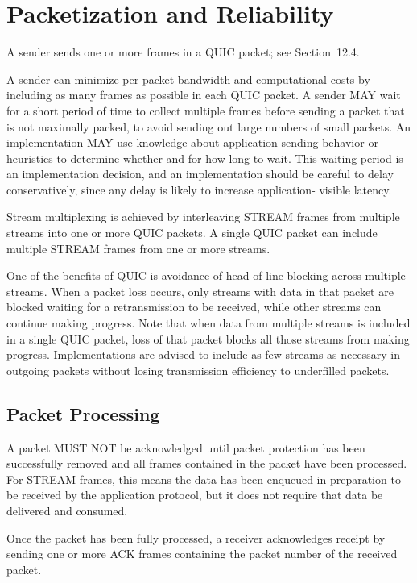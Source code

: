 \documentclass{article}
\begin{document}
\section{Packetization and Reliability}

A sender sends one or more frames in a QUIC packet; see Section~12.4.

A sender can minimize per-packet bandwidth and computational costs by including as many frames as possible in each QUIC packet.  A sender MAY wait for a short period of time to collect multiple frames before sending a packet that is not maximally packed, to avoid sending out large numbers of small packets.  An implementation MAY use knowledge about application sending behavior or heuristics to determine whether and for how long to wait.  This waiting period is an implementation decision, and an implementation should be careful to delay conservatively, since any delay is likely to increase application- visible latency.

Stream multiplexing is achieved by interleaving STREAM frames from multiple streams into one or more QUIC packets.  A single QUIC packet can include multiple STREAM frames from one or more streams.

One of the benefits of QUIC is avoidance of head-of-line blocking across multiple streams.  When a packet loss occurs, only streams with data in that packet are blocked waiting for a retransmission to be received, while other streams can continue making progress.  Note that when data from multiple streams is included in a single QUIC packet, loss of that packet blocks all those streams from making progress.  Implementations are advised to include as few streams as necessary in outgoing packets without losing transmission efficiency to underfilled packets.

\subsection{Packet Processing}

A packet MUST NOT be acknowledged until packet protection has been successfully removed and all frames contained in the packet have been processed.  For STREAM frames, this means the data has been enqueued in preparation to be received by the application protocol, but it does not require that data be delivered and consumed.

Once the packet has been fully processed, a receiver acknowledges receipt by sending one or more ACK frames containing the packet number of the received packet.
\end{document}
